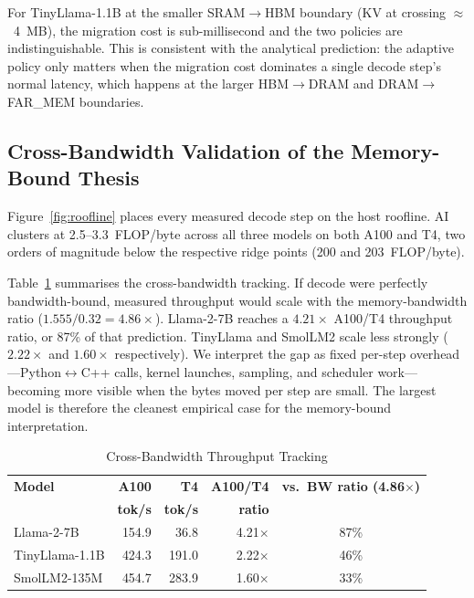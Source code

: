 \documentclass[conference]{IEEEtran}
\begin{document}
For TinyLlama-1.1B at the smaller SRAM$\rightarrow$HBM boundary (KV at crossing $\approx$~4~MB), the migration cost is sub-millisecond and the two policies are indistinguishable. This is consistent with the analytical prediction: the adaptive policy only matters when the migration cost dominates a single decode step's normal latency, which happens at the larger HBM$\rightarrow$DRAM and DRAM$\rightarrow$FAR\_MEM boundaries.

\subsection{Cross-Bandwidth Validation of the Memory-Bound Thesis}
\label{sec:results-cross}

Figure~\ref{fig:roofline} places every measured decode step on the host roofline. AI clusters at 2.5--3.3~FLOP/byte across all three models on both A100 and T4, two orders of magnitude below the respective ridge points (200 and 203~FLOP/byte).

Table~\ref{tab:cross-bw} summarises the cross-bandwidth tracking. If decode were perfectly bandwidth-bound, measured throughput would scale with the memory-bandwidth ratio ($1.555 / 0.32 = 4.86\times$). Llama-2-7B reaches a $4.21\times$ A100/T4 throughput ratio, or 87\% of that prediction. TinyLlama and SmolLM2 scale less strongly ($2.22\times$ and $1.60\times$ respectively). We interpret the gap as fixed per-step overhead---Python$\leftrightarrow$C++ calls, kernel launches, sampling, and scheduler work---becoming more visible when the bytes moved per step are small. The largest model is therefore the cleanest empirical case for the memory-bound interpretation.

\begin{table}[H]
\caption{Cross-Bandwidth Throughput Tracking}
\label{tab:cross-bw}
\centering
\renewcommand{\arraystretch}{1.15}
\setlength{\tabcolsep}{4pt}
\begin{tabular}{|l|r|r|r|c|}
\hline
\textbf{Model} & \textbf{A100} & \textbf{T4} & \textbf{A100/T4} & \textbf{vs.\ BW ratio (4.86$\times$)} \\
               & \textbf{tok/s} & \textbf{tok/s} & \textbf{ratio} & \\
\hline
Llama-2-7B     & 154.9 &  36.8 & 4.21$\times$ & 87\%  \\
\hline
TinyLlama-1.1B & 424.3 & 191.0 & 2.22$\times$ & 46\%  \\
\hline
SmolLM2-135M   & 454.7 & 283.9 & 1.60$\times$ & 33\%  \\
\hline
\end{tabular}
\end{table}
\end{document}

